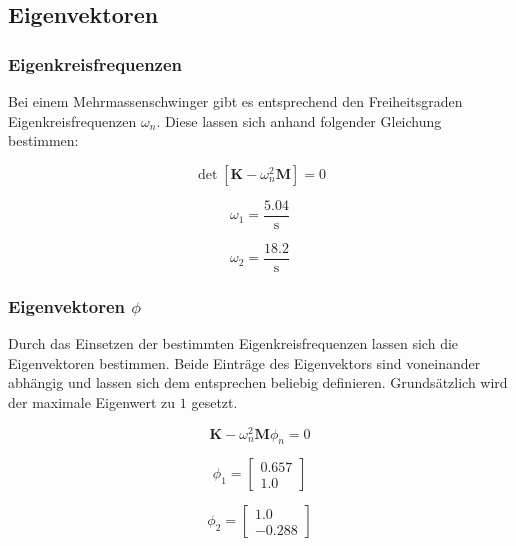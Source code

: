 \documentclass[
  letterpaper,
  DIV=11]{scrreprt}
\begin{document}
\hypertarget{eigenvektoren-5}{%
\subsection{Eigenvektoren}\label{eigenvektoren-5}}

\hypertarget{eigenkreisfrequenzen-6}{%
\subsubsection{Eigenkreisfrequenzen}\label{eigenkreisfrequenzen-6}}

Bei einem Mehrmassenschwinger gibt es entsprechend den Freiheitsgraden
Eigenkreisfrequenzen \(\omega_n\). Diese lassen sich anhand folgender
Gleichung bestimmen:

\[\det{[\mathbf{K}-\omega_n^2 \mathbf{M}]=0}\]

\begin{equation}\omega_{1} = \frac{5.04}{\text{s}}\end{equation}

\begin{equation}\omega_{2} = \frac{18.2}{\text{s}}\end{equation}

\hypertarget{eigenvektoren-phi-4}{%
\subsubsection{\texorpdfstring{Eigenvektoren
\(\phi\)}{Eigenvektoren \textbackslash phi}}\label{eigenvektoren-phi-4}}

Durch das Einsetzen der bestimmten Eigenkreisfrequenzen lassen sich die
Eigenvektoren bestimmen. Beide Einträge des Eigenvektors sind
voneinander abhängig und lassen sich dem entsprechen beliebig
definieren. Grundsätzlich wird der maximale Eigenwert zu \(1\) gesetzt.

\[\mathbf{K} - \omega_n^2 \mathbf{M} \phi_n= 0\]

\begin{equation}\phi_{1} = \left[\begin{matrix}0.657\\1.0\end{matrix}\right]\end{equation}

\begin{equation}\phi_{2} = \left[\begin{matrix}1.0\\-0.288\end{matrix}\right]\end{equation}
\end{document}
